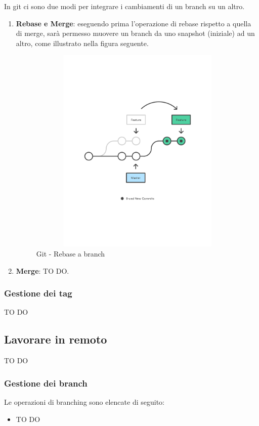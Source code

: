 		In git ci sono due modi per integrare i cambiamenti di un branch su un altro.
			\begin{enumerate}
				\item \textbf{Rebase e Merge}: eseguendo prima l'operazione di rebase rispetto a quella di merge, sarà permesso muovere un branch da uno snapshot (iniziale) ad un altro, come illustrato nella figura seguente.
					\begin{figure}[htbp]
						\centering
						\includegraphics[height=10cm, width=12cm]{images/rebase.pdf}
						\caption{Git - Rebase a branch}
						\label{fig:git_rebase_a_branch}
					\end{figure}
				

				\item \textbf{Merge}: TO DO.

			\end{enumerate}


		\subsubsection{Gestione dei tag} %
		\label{ssub:gestione_dei_tag_locale}
		TO DO


	\subsection{Lavorare in remoto} %
	\label{sub:lavorare_in_remoto}
	TO DO
		\subsubsection{Gestione dei branch} %
		\label{ssub:gestione_dei_branch_remoto}
		Le operazioni di branching sono elencate di seguito:
			\begin{itemize}
				\item TO DO
			\end{itemize}

